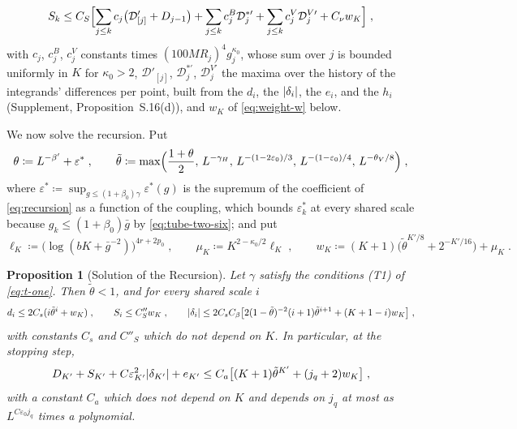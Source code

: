 \documentclass[11pt]{preprint}
\DeclarePairedDelimiter{\abs}{\lvert}{\rvert}
\numberwithin{equation}{section}
\newtheorem{proposition}[theorem]{Proposition}
\theoremstyle{definition}
\theoremstyle{remark}
\theoremstyle{plain}
\begin{document}
\begin{equation}\label{eq:r-recursion}
    S_k \leq C_S\Bigl[\sum_{j \leq k}c_j\bigl(\mathcal D'_{[j]} + D_{j-1}\bigr) + \sum_{j \leq k}c^B_j\mathcal D^{*\prime}_j + \sum_{j \leq k}c^V_j\mathcal D^{V\prime}_j + C_\nu w_K\Bigr]\;,
\end{equation}
with $c_j$, $c^B_j$, $c^V_j$ constants times $(100MR_j)^4g_j^{\kappa_0}$, whose sum over $j$ is bounded uniformly in $K$ for $\kappa_0 > 2$, $\mathcal D'_{[j]}$, $\mathcal D^{*\prime}_j$, $\mathcal D^{V\prime}_j$ the maxima over the history of the integrands' differences per point, built from the $d_i$, the $\abs{\delta_i}$, the $e_i$, and the $h_i$ (Supplement, Proposition~S.16(d)), and $w_K$ of \eqref{eq:weight-w} below.

We now solve the recursion. Put
\begin{equation}\label{eq:theta-tilde}
    \theta \coloneqq L^{-\beta'} + \varepsilon^*\;,
    \qquad
    \tilde\theta \coloneqq \max\Bigl(\frac{1 + \theta}{2},\, L^{-\gamma_H},\, L^{-(1-2\varepsilon_0)/3},\, L^{-(1-\varepsilon_0)/4},\, L^{-\theta_V/8}\Bigr)\;,
\end{equation}
where $\varepsilon^* \coloneqq \sup_{g \leq (1+\beta_0)\gamma}\varepsilon^*(g)$ is the supremum of the coefficient of \eqref{eq:recursion} as a function of the coupling, which bounds $\varepsilon^*_k$ at every shared scale because $g_k \leq (1 + \beta_0)\bar g$ by \eqref{eq:tube-two-six}; and put
\begin{equation}\label{eq:weight-w}
    \ell_K \coloneqq \bigl(\log(bK + \bar g^{-2})\bigr)^{4r+2p_0}\;,
    \qquad
    \mu_K \coloneqq K^{2-\kappa_0/2}\ell_K\;,
    \qquad
    w_K \coloneqq (K + 1)\bigl(\tilde\theta^{K'/8} + 2^{-K'/16}\bigr) + \mu_K\;.
\end{equation}

\begin{proposition}[Solution of the Recursion]\label{prop:recursion-solution}
Let $\gamma$ satisfy the conditions (T1) of \eqref{eq:t-one}. Then $\tilde\theta < 1$, and for every shared scale $i$
\begin{equation}\label{eq:recursion-solution}
    d_i \leq 2C_s(i\tilde\theta^i + w_K)\;,
    \qquad
    S_i \leq C''_Sw_K\;,
    \qquad
    \abs{\delta_i} \leq 2C_sC_\beta\bigl[2(1 - \tilde\theta)^{-2}(i + 1)\tilde\theta^{i+1} + (K + 1 - i)w_K\bigr]\;,
\end{equation}
with constants $C_s$ and $C''_S$ which do not depend on $K$. In particular, at the stopping step,
\begin{equation}\label{eq:stopping-differences}
    D_{K'} + S_{K'} + C\varepsilon_{K'}^2\abs{\delta_{K'}} + e_{K'} \leq C_a\bigl[(K + 1)\tilde\theta^{K'} + (j_q + 2)w_K\bigr]\;,
\end{equation}
with a constant $C_a$ which does not depend on $K$ and depends on $j_q$ at most as $L^{C\varepsilon_0j_q}$ times a polynomial.
\end{proposition}
\end{document}
